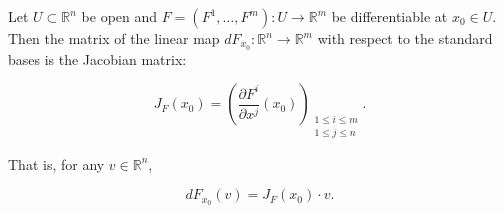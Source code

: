 Let $U \subset \mathbb{R}^n$ be open and $F = (F^1, \ldots, F^m): U \to \mathbb{R}^m$ be differentiable at $x_0 \in U$. Then the matrix of the linear map $dF_{x_0}: \mathbb{R}^n \to \mathbb{R}^m$ with respect to the standard bases is the Jacobian matrix:

$$J_F(x_0) = \left( \frac{\partial F^i}{\partial x^j}(x_0) \right)_{\substack{1 \leq i \leq m \\ 1 \leq j \leq n}}.$$

That is, for any $v \in \mathbb{R}^n$,

$$dF_{x_0}(v) = J_F(x_0) \cdot v.$$
